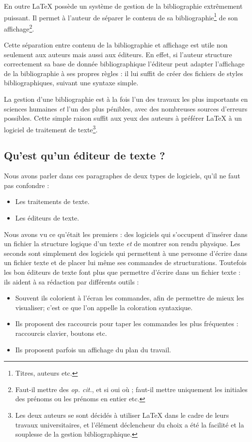 En outre \LaTeX{} possède un système de gestion de la bibliographie extrêmement puissant. Il permet à l'auteur de séparer le contenu de sa bibliographie\footnote{Titres, auteurs etc.} de son affichage\footnote{Faut-il mettre des \emph{op. cit.}, et si oui où ; faut-il mettre uniquement les initiales des prénoms ou les prénoms en entier etc.}.

Cette séparation entre contenu de la bibliographie et affichage est utile non seulement aux auteurs mais aussi aux éditeurs. En effet, si l'auteur structure correctement sa base de donnée bibliographique l'éditeur peut adapter l'affichage de la bibliographie à ses propres règles : il lui suffit de créer des fichiers de styles bibliographiques, suivant une syntaxe simple.

La gestion d'une bibliographie est à la fois l'un des travaux les plus importants en sciences humaines \emph{et} l'un des plus pénibles, avec des nombreuses sources d'erreurs possibles. Cette simple raison suffit aux yeux des auteurs à préférer \LaTeX{} à un logiciel de traitement de texte\footnote{Les deux auteurs se sont décidés à utiliser \LaTeX{} dans le cadre de leurs travaux universitaires, et l'élément déclencheur du choix a été la facilité et la souplesse de la gestion bibliographique.}.

\subsection{Qu'est qu'un éditeur de texte ?}

Nous avons parler dans ces paragraphes de deux types de logiciels, qu'il ne faut pas confondre :
\begin{itemize}
	\item Les traitements de texte.
	\item Les éditeurs de texte.
\end{itemize}

Nous avons vu ce qu'était les premiers : des logiciels qui s'occupent d'insérer dans un fichier la structure logique d'un texte \emph{et} de montrer son rendu physique.
Les seconds sont simplement des logiciels qui permettent à une personne d'écrire dans un fichier texte et de placer lui même ses commandes de structurations.
Toutefois les bon éditeurs de texte font plus que permettre d'écrire dans un fichier texte : ils aident à sa rédaction par différents outils :
\begin{itemize}
\item Souvent ils colorient à l'écran les commandes, afin de permettre de mieux les visualiser; c'est ce que l'on appelle la coloration syntaxique.
\item Ils proposent des raccourcis pour taper les commandes les plus fréquentes :  raccourcis clavier, boutons etc.
\item Ils proposent parfois un affichage du plan du travail.
\end{itemize}

